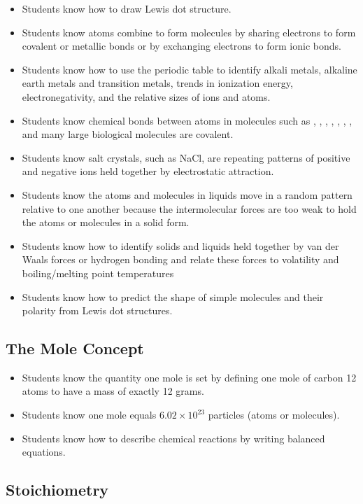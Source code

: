 \documentclass[12pt]{article}
\begin{document}
\begin{itemize}
    \item Students know how to draw Lewis dot structure.
    \item Students know atoms combine to form molecules by sharing electrons to form covalent or metallic bonds or by exchanging electrons to form ionic bonds.
    \item Students know how to use the periodic table to identify alkali metals, alkaline earth metals and transition metals, trends in ionization energy, electronegativity, and the relative sizes of ions and atoms.
    \item Students know chemical bonds between atoms in molecules such as , , , , , , , and many large biological molecules are covalent.
    \item Students know salt crystals, such as NaCl, are repeating patterns of positive and negative ions held together by electrostatic attraction.
    \item Students know the atoms and molecules in liquids move in a random pattern relative to one another because the intermolecular forces are too weak to hold the atoms or molecules in a solid form.
    \item Students know how to identify solids and liquids held together by van der Waals forces or hydrogen bonding and relate these forces to volatility and boiling/melting point temperatures
    \item Students know how to predict the shape of simple molecules and their polarity from Lewis dot structures.
\end{itemize}

\subsection{The Mole Concept}

\begin{itemize}
    \item Students know the quantity one mole is set by defining one mole of carbon 12 atoms to have a mass of exactly 12 grams.
    \item Students know one mole equals $6.02 \times 10^{23}$ particles (atoms or molecules).
    \item Students know how to describe chemical reactions by writing balanced equations.
\end{itemize}

\subsection{Stoichiometry}
\end{document}
